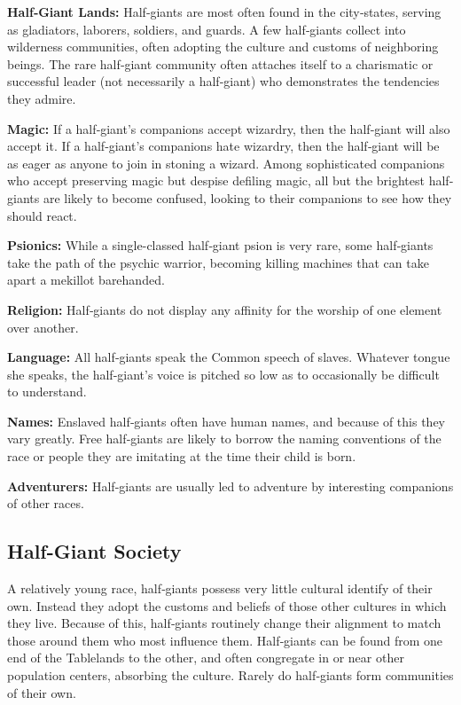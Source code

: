\textbf{Half‐Giant Lands:} Half‐giants are most often found in the city‐states, serving as gladiators, laborers, soldiers, and guards. A few half‐giants collect into wilderness communities, often adopting the culture and customs of neighboring beings. The rare half‐giant community often attaches itself to a charismatic or successful leader (not necessarily a half‐giant) who demonstrates the tendencies they admire.

\textbf{Magic:} If a half‐giant's companions accept wizardry, then the half‐giant will also accept it. If a half‐giant's companions hate wizardry, then the half‐giant will be as eager as anyone to join in stoning a wizard. Among sophisticated companions who accept preserving magic but despise defiling magic, all but the brightest half‐giants are likely to become confused, looking to their companions to see how they should react.

\textbf{Psionics:} While a single-classed half‐giant psion is very rare, some half‐giants take the path of the psychic warrior, becoming killing machines that can take apart a mekillot barehanded.

\textbf{Religion:} Half‐giants do not display any affinity for the worship of one element over another.

\textbf{Language:} All half‐giants speak the Common speech of slaves. Whatever tongue she speaks, the half‐giant's voice is pitched so low as to occasionally be difficult to understand.

\textbf{Names:} Enslaved half‐giants often have human names, and because of this they vary greatly. Free half‐giants are likely to borrow the naming conventions of the race or people they are imitating at the time their child is born.

\textbf{Adventurers:} Half‐giants are usually led to adventure by interesting companions of other races.

\subsection{Half-Giant Society}
A relatively young race, half‐giants possess very little cultural identify of their own. Instead they adopt the customs and beliefs of those other cultures in which they live. Because of this, half‐giants routinely change their alignment to match those around them who most influence them.
Half‐giants can be found from one end of the Tablelands to the other, and often congregate in or near other population centers, absorbing the culture. Rarely do half‐giants form communities of their own.

